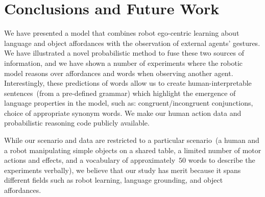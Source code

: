 
\section{Conclusions and Future Work}
\label{sec:conclusions}

We have presented a model that combines robot ego-centric learning about language and object affordances with the observation of external agents' gestures.
We have illustrated a novel probabilistic method to fuse these two sources of information, and we have shown a number of experiments where the robotic model reasons over affordances and words when observing another agent.
Interestingly, these predictions of words allow us to create human-interpretable sentences~(from a pre-defined grammar) which highlight the emergence of language properties in the model, such as:
congruent/incongruent conjunctions,
choice of appropriate synonym words. %
We make our human action data and probabilistic reasoning code publicly available.

While our scenario and data are restricted to a particular scenario~(a human and a robot manipulating simple objects on a shared table, a limited number of motor actions and effects, and a vocabulary of approximately~$50$ words to describe the experiments verbally), we believe that our study has merit because it spans different fields such as robot learning, language grounding, and object affordances.

